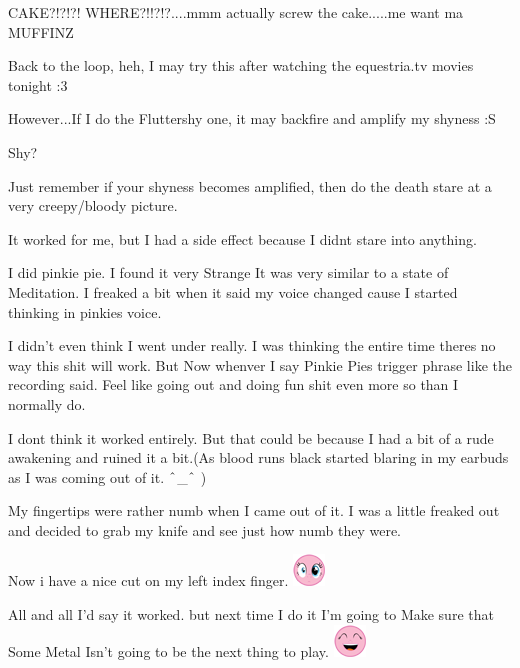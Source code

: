 \documentclass[ebook,12pt,oneside,openany]{memoir}
\newcommand{\carat}{$\char`\^$}
\begin{document}
\begin{tcolorbox}[title=Milk Wave]
\begin{tcolorbox}[title=Parsleyshy]
\par{CAKE?!?!?! WHERE?!!?!?....mmm actually screw the cake.....me want ma MUFFINZ }
\newline{}
\par{Back to the loop, heh, I may try this after watching the equestria.tv movies tonight :3}
\newline{}
\par{However...If I do the Fluttershy one, it may backfire and amplify my shyness :S}
\end{tcolorbox}
\par{Shy?}
\par{Just remember if your shyness becomes amplified, then do the death stare at a very creepy/bloody picture.}
\par{It worked for me, but I had a side effect because I didnt stare into anything.}
\end{tcolorbox}
\begin{tcolorbox}[title=Yourmomsponies]
\par{I did pinkie pie. I found it very Strange It was very similar to a state of Meditation. I freaked a bit when it said my voice changed cause I started thinking in pinkies voice.}
\par{I didn't even think I went under really. I was thinking the entire time theres no way this shit will work. But Now whenver I say Pinkie Pies trigger phrase like the recording said.  Feel like going out and doing fun shit even more so than I normally do.}
\par{I dont think it worked entirely. But that could be because I had a bit of a rude awakening and ruined it a bit.(As blood runs black started blaring in my earbuds as I was coming out of it. \carat{}\_\carat{} )}
\par{My fingertips were rather numb when I came out of it. I was a little freaked out and decided to grab my knife and see just how numb they were.}
\par{Now i have a nice cut on my left index finger. \includegraphics{images/mlp_blink.png}}
\par{All and all I'd say it worked. but next time I do it I'm going to Make sure that Some Metal Isn't going to be the next thing to play.  \includegraphics{images/mlp_laugh.png}}
\end{tcolorbox}
\end{document}

